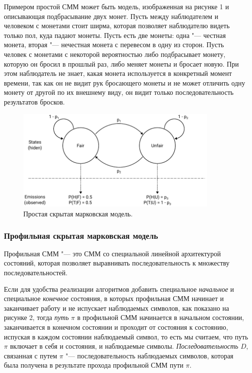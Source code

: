 \documentclass[]{article}
\begin{document}
			Примером простой СММ может быть модель, изображенная на рисунке 1 и описывающая подбрасывание двух монет. Пусть между наблюдателем и человеком с монетами стоит ширма, которая позволяет наблюдателю видеть только пол, куда падают монеты. Пусть есть две монеты: одна "--- честная монета, вторая "--- нечестная монета с перевесом в одну из сторон. Пусть человек с монетами с некоторой вероятностью либо подбрасывает монету, которую он бросил в прошлый раз, либо меняет монеты и бросает новую. При этом наблюдатель не знает, какая монета используется в конкретный момент времени, так как он не видит рук бросающего монеты и не может отличить одну монету от другой по их внешнему виду, он видит только последовательность результатов бросков.
			
			\begin{figure}[h]
				\includegraphics[width=10cm]{figure1}
				\centering
				\caption{Простая скрытая марковская модель.}
			\end{figure}
		
			\subsubsection{Профильная скрытая марковская модель}
			Профильная СММ "--- это СММ со специальной линейной архитектурой состояний, которая позволяет выравнивать последовательность к множеству последовательностей.						
									
			Если для удобства реализации алгоритмов добавить специальное \textit{начальное} и специальное \textit{конечное} состояния, в которых профильная СММ начинает и заканчивает работу и не испускает наблюдаемых символов, как показано на рисунке 2, тогда \textit{путь} $\pi$ в профильной СММ начинается в начальном состоянии, заканчивается в конечном состоянии и проходит от состояния к состоянию, испуская в каждом состоянии наблюдаемый символ, то есть мы считаем, что путь $\pi$ включает в себя и состояния, и наблюдаемые символы. \textit{Последовательность} $D$, связанная с путем $\pi$ "--- последовательность наблюдаемых символов, которая была получена в результате прохода профильной СММ пути $\pi$. 
			
\end{document}
